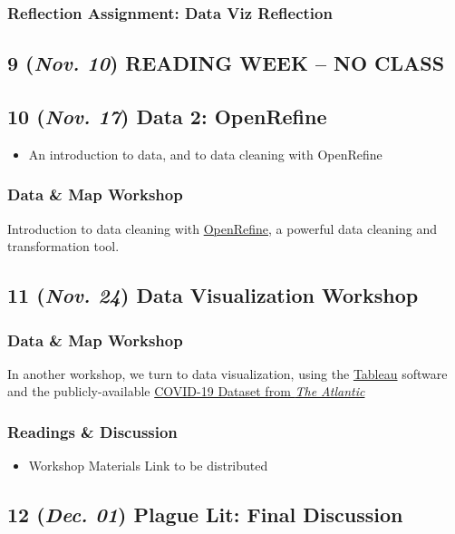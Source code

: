 \documentclass[11pt]{article}
\begin{document}
\subsubsection*{Reflection Assignment: Data Viz Reflection}
\label{sec:org8e125cb}

\subsection*{9 (\textit{Nov. 10}) READING WEEK -- NO CLASS}
\label{sec:org7a382dd}
\subsection*{10 (\textit{Nov. 17}) Data 2: OpenRefine}
\label{sec:org7e8f5eb}
\begin{itemize}
\item An introduction to data, and to data cleaning with OpenRefine
\end{itemize}
\subsubsection*{Data \& Map Workshop}
\label{sec:org92d8903}
Introduction to data cleaning with \href{http://openrefine.org/}{OpenRefine}, a powerful data cleaning and transformation tool. 
\subsection*{11 (\textit{Nov. 24}) Data Visualization Workshop}
\label{sec:org5bfa486}
\subsubsection*{Data \& Map Workshop}
\label{sec:orgdbd8d97}
In another workshop, we turn to data visualization, using the  \href{https://www.tableau.com/}{Tableau} software and the publicly-available \href{https://covidtracking.com/data/api}{COVID-19 Dataset from \emph{The Atlantic}}
\subsubsection*{Readings \& Discussion}
\label{sec:org6b1c1ed}
\begin{itemize}
\item Workshop Materials Link to be distributed
\end{itemize}
\subsection*{12 (\textit{Dec. 01}) Plague Lit: Final Discussion}
\label{sec:org7589e7e}
\end{document}
